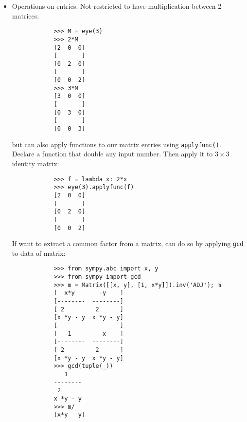 \documentclass{article}
\begin{document}
\begin{itemize}
\begin{itemize}
\begin{verbatim}
			[102  126  150]
		\end{verbatim}
		As well as some useful vector operations:
		\begin{verbatim}
			>>> M.row_del(0)
			>>> M
			[4  5  6]
			[       ]
			[7  8  9]
			>>> M.col_del(1)
			>>> M
			[4  6]
			[    ]
			[7  9]
			>>> v1 = Matrix([1,2,3])
			>>> v2 = Matrix([4,5,6])
			>>> v3 = v1.cross(v2)
			>>> v1.dot(v2)
			32
			>>> v2.dot(v3)
			0
			>>> v1.dot(v3)
			0			
		\end{verbatim}
		Recall: \verb|row_del(), col_del()| operations don't return a value -- they simply change matrix object. Can also ``glue'' together matrices of appropriate size:
		\begin{verbatim}
			>>> M1 = eye(3)
			>>> M2 = zeros(3, 4)
			>>> M1.row_join(M2)
			[1  0  0  0  0  0  0]
			[                   ]
			[0  1  0  0  0  0  0]
			[                   ]
			[0  0  1  0  0  0  0]
			>>> M3 = zeros(4, 3)
			>>> M1.col_join(M3)
			[1  0  0]
			[       ]
			[0  1  0]
			[       ]
			[0  0  1]
			[       ]
			[0  0  0]
			[       ]
			[0  0  0]
			[       ]
			[0  0  0]
			[       ]
			[0  0  0]
		\end{verbatim}
		\item {\sf Operations on entries.} Not restricted to have multiplication between 2 matrices:
		\begin{verbatim}
			>>> M = eye(3)
			>>> 2*M
			[2  0  0]
			[       ]
			[0  2  0]
			[       ]
			[0  0  2]
			>>> 3*M
			[3  0  0]
			[       ]
			[0  3  0]
			[       ]
			[0  0  3]
		\end{verbatim}
		but can also apply functions to our matrix entries using {\tt applyfunc()}. Declare a function that double any input number. Then apply it to $3\times3$ identity matrix:
		\begin{verbatim}
			>>> f = lambda x: 2*x
			>>> eye(3).applyfunc(f)
			[2  0  0]
			[       ]
			[0  2  0]
			[       ]
			[0  0  2]
		\end{verbatim}
		If want to extract a common factor from a matrix, can do so by applying {\tt gcd} to data of matrix:
		\begin{verbatim}
			>>> from sympy.abc import x, y
			>>> from sympy import gcd
			>>> m = Matrix([[x, y], [1, x*y]]).inv('ADJ'); m
			[  x*y       -y    ]
			[--------  --------]
			[ 2         2      ]
			[x *y - y  x *y - y]
			[                  ]
			[  -1         x    ]
			[--------  --------]
			[ 2         2      ]
			[x *y - y  x *y - y]
			>>> gcd(tuple(_))
			   1
			--------
			 2
			x *y - y
			>>> m/_
			[x*y  -y]

\end{verbatim}
\end{itemize}
\end{itemize}
\end{document}
